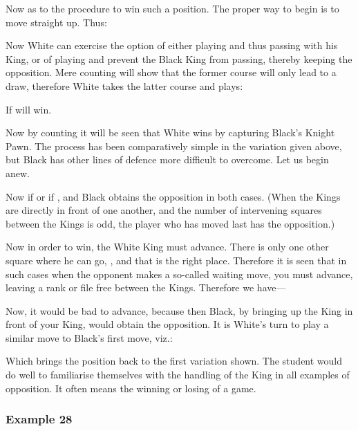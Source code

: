 \documentclass[11pt,a4paper]{book}
\begin{document}
Now as to the procedure to win such a position. The proper way to begin is to move straight up. Thus:


Now White can exercise the option of either playing  and thus passing with his King, or of playing  and prevent the Black King from passing, thereby keeping the opposition. Mere counting will show that the former course will only lead to a draw, therefore White takes the latter course and plays:


If  will win.


Now by counting it will be seen that White wins by capturing Black's Knight Pawn. The process has been comparatively simple in the variation given above, but Black has other lines of defence more difficult to overcome. Let us begin anew.

\newgame
{}


Now if  or if , and Black obtains the opposition in both cases. (When the Kings are directly in front of one another, and the number of intervening squares between the Kings is odd, the player who has moved last has the opposition.)

Now in order to win, the White King must advance. There is only one other square where he can go, , and that is the right place. Therefore it is seen that in such cases when the opponent makes a so-called waiting move, you must advance, leaving a rank or file free between the Kings. Therefore we have—


Now, it would be bad to advance, because then Black, by bringing up the King in front of your King, would obtain the opposition. It is White's turn to play a similar move to Black's first move, viz.:


Which brings the position back to the first variation shown. The student would do well to familiarise themselves with the handling of the King in all examples of opposition. It often means the winning or losing of a game.

\subsubsection*{Example 28}
\end{document}
